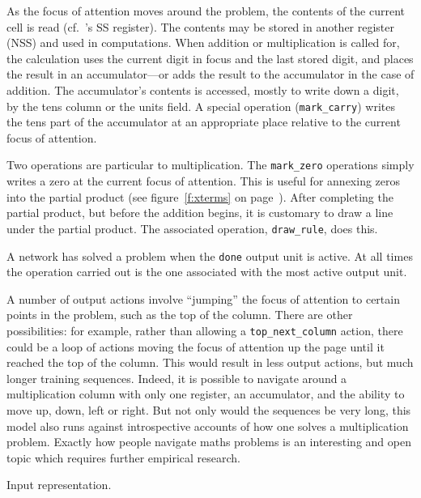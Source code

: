 As the focus of attention moves around the problem, the contents of the
current cell is read (cf.~\citeauthor{suppproc}'s SS register). The
contents may be stored in another register (NSS) and used in
computations.
When addition or multiplication is called for, the
calculation uses the current digit in focus and the last stored digit, and
places the result in an accumulator---or adds
the result to the accumulator in
the case of addition.  The accumulator's contents
is accessed, mostly to write
down a digit, by the tens column or the units field.  A
special operation (\verb|mark_carry|) writes the tens part of the
accumulator at an appropriate place relative to the current focus of
attention.

Two operations are particular to multiplication.  The \verb|mark_zero|
operations simply writes a zero at the current focus of attention.  This is
useful for annexing zeros
into the partial product
(see figure~\ref{f:xterms} on page~\pageref{f:xterms}).  After completing
the
partial product, but before the addition begins, it is customary to draw a
line under the partial product. The associated operation,
\verb|draw_rule|, does this.

A network has solved a problem when the \verb|done| output unit is active.
At all times the operation carried out is the one associated with
the most active output unit.

A number of output actions involve ``jumping'' the focus of attention to
certain points in the problem, such as the top of the column.  There are
other possibilities: for example, rather than allowing a
\verb|top_next_column| action, there could be a loop of actions moving the
focus of attention up the page until it reached the top of the column. This
would result in less output actions, but much longer training sequences.
Indeed, it is possible to navigate around a multiplication column with only
one register, an accumulator, and the ability to move up, down, left or
right.  But not only would the sequences be very
long, this model also runs against introspective accounts of how one solves
a multiplication problem.  Exactly how people navigate
maths problems is an interesting and open topic which requires further
empirical research.


\begin{fancyfigure}
\centerline{}
\caption{Input representation.}
\label{f:inrep}
\end{fancyfigure}

